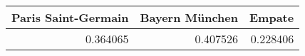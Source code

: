 \begin{tabular}{rrr}
\hline
   Paris Saint-Germain &   Bayern München &   Empate \\
\hline
              0.364065 &         0.407526 & 0.228406 \\
\hline
\end{tabular}